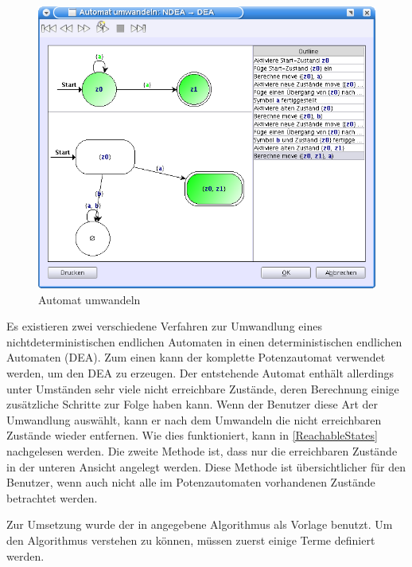 \begin{figure}[h!]
\begin{center}
\includegraphics[width=12cm]{../images/convert_to.png}
\caption{Automat umwandeln}
\label{FigureConvertTo}
\end{center}
\end{figure}
\vspace{10pt}

Es existieren zwei verschiedene Verfahren zur Umwandlung eines
nichtdeterministischen endlichen Automaten in einen deterministischen endlichen
Automaten (DEA). Zum einen kann der komplette Potenzautomat verwendet werden, um
den DEA zu erzeugen. Der entstehende Automat enthält allerdings unter Umständen
sehr viele nicht erreichbare Zustände, deren Berechnung einige zusätzliche
Schritte zur Folge haben kann. Wenn der Benutzer diese Art der Umwandlung
auswählt, kann er nach dem Umwandeln die nicht erreichbaren Zustände wieder
entfernen. Wie dies funktioniert, kann in \ref{ReachableStates} nachgelesen
werden. Die zweite Methode ist, dass nur die erreichbaren Zustände in der unteren
Ansicht angelegt werden. Diese Methode ist übersichtlicher für den Benutzer, wenn
auch nicht alle im Potenzautomaten vorhandenen Zustände betrachtet
werden.\vspace{10pt}

\newpage
Zur Umsetzung wurde der in \cite[S. 153ff]{Compilers} angegebene Algorithmus als
Vorlage benutzt. Um den Algorithmus verstehen zu können, müssen zuerst einige
Terme definiert werden.\vspace{10pt}

